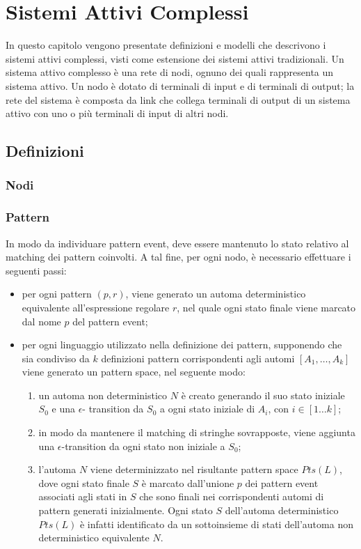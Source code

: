 \chapter{Sistemi Attivi Complessi}
In questo capitolo vengono presentate definizioni e modelli che descrivono i sistemi attivi complessi, visti come estensione dei sistemi attivi tradizionali. Un sistema attivo complesso è una rete di nodi, ognuno dei quali rappresenta un sistema attivo. Un nodo è dotato di terminali di input e di terminali di output; la rete del sistema è composta da link che collega terminali di output di un sistema attivo con uno o più terminali di input di altri nodi.


\section{Definizioni}
\subsection{Nodi}

\subsection{Pattern}
In modo da individuare pattern event, deve essere mantenuto lo stato relativo al matching dei pattern coinvolti. A tal fine, per ogni nodo, è necessario effettuare i seguenti passi:
\begin{itemize}
\item per ogni pattern $(p,r)$, viene generato un automa deterministico equivalente all'espressione regolare $r$, nel quale ogni stato finale viene marcato dal nome $p$ del pattern event;
\item per ogni linguaggio utilizzato nella definizione dei pattern, supponendo che sia condiviso da $k$ definizioni pattern corrispondenti agli automi $[A_1, \ldots , A_k]$ viene generato un pattern space, nel seguente modo:
	\begin{enumerate}
	\item un automa non deterministico $N$ è creato generando il suo stato iniziale $S_0$ e una $\epsilon$-			transition da $S_0$ a ogni stato iniziale di $A_i$, con $i \in [1 \ldots k]$;
	\item in modo da mantenere il matching di stringhe sovrapposte, viene aggiunta una $\epsilon$-transition
	da ogni stato non iniziale a $S_0$;
	\item l'automa $N$ viene determinizzato nel risultante pattern space $Pts(L)$, dove ogni stato finale $S$ è marcato dall'unione $p$ dei pattern event associati agli stati in $S$ che sono finali nei corrispondenti automi di pattern generati inizialmente. Ogni stato $S$ dell'automa deterministico $Pts(L)$ è infatti identificato da un sottoinsieme di stati dell'automa non deterministico equivalente $N$.
	\end{enumerate}
\end{itemize}

